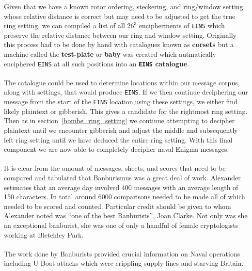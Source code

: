 \noindent Given that we have a known rotor ordering, steckering, and ring/window setting whose relative distance is correct but may need to be adjusted to get the true ring setting, we can compiled a list of all $26^3$ encipherments of \texttt{EINS} which preserve the relative distance between our ring and window setting. Originally this process had to be done by hand with catalogues known as {\bf{corsets}} but a machine called the {\bf{test-plate}} or {\bf{baby}} was created which autmatically enciphered \texttt{EINS} at all such positions into an {\bf{\texttt{EINS} catalogue}}.
\\\\The catalogue could be used to determine locations within our message corpus, along with settings, that would produce \texttt{EINS}. If we then continue deciphering our message from the start of the \texttt{EINS} location,using these settings, we either find likely plaintext or gibberish. This gives a candidate for the rightmost ring setting. Then as in section~\ref{bombe_ring_setting} we continue attempting to decipher plaintext until we encounter gibberish and adjust the middle and subsequently left ring setting until we have deduced the entire ring setting. With this final component we are now able to completely decipher naval Enigma messages.
\\\\It is clear from the amount of messages, sheets, and scores that need to be compared and tabulated that Banburismus was a great deal of work. Alexander estimates that an average day involved 400 messages with an average length of 150 characters. In total around 6000 comparisons needed to be made all of which needed to be scored and counted. Particular credit should be given to whom Alexander noted was ``one of the best Banburists'', Joan Clarke. Not only was she an exceptional banburist, she was one of only a handful of female cryptologists working at Bletchley Park.
\\\\The work done by Banburists provided crucial information on Naval operations including U-Boat attacks which were crippling supply lines and starving Britain.


